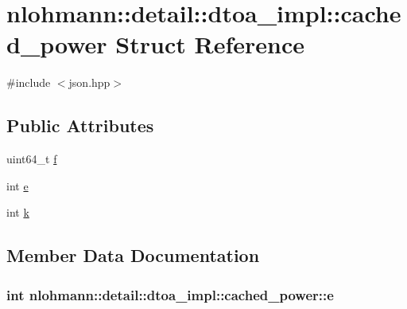 \hypertarget{structnlohmann_1_1detail_1_1dtoa__impl_1_1cached__power}{}\section{nlohmann\+:\+:detail\+:\+:dtoa\+\_\+impl\+:\+:cached\+\_\+power Struct Reference}
\label{structnlohmann_1_1detail_1_1dtoa__impl_1_1cached__power}


{\ttfamily \#include $<$json.\+hpp$>$}

\subsection*{Public Attributes}
\begin{DoxyCompactItemize}
\item 
uint64\+\_\+t \hyperlink{structnlohmann_1_1detail_1_1dtoa__impl_1_1cached__power_a56a47ff88dce47986dd938f2ccb2abbf}{f}
\item 
int \hyperlink{structnlohmann_1_1detail_1_1dtoa__impl_1_1cached__power_a9e89bc89bb7bf4361f43ea27eed91d23}{e}
\item 
int \hyperlink{structnlohmann_1_1detail_1_1dtoa__impl_1_1cached__power_a8c1f2efed643eeaa8fae83c697a29c6a}{k}
\end{DoxyCompactItemize}


\subsection{Member Data Documentation}
\subsubsection[{\texorpdfstring{e}{e}}]{\setlength{\rightskip}{0pt plus 5cm}int nlohmann\+::detail\+::dtoa\+\_\+impl\+::cached\+\_\+power\+::e}\hypertarget{structnlohmann_1_1detail_1_1dtoa__impl_1_1cached__power_a9e89bc89bb7bf4361f43ea27eed91d23}{}\label{structnlohmann_1_1detail_1_1dtoa__impl_1_1cached__power_a9e89bc89bb7bf4361f43ea27eed91d23}
